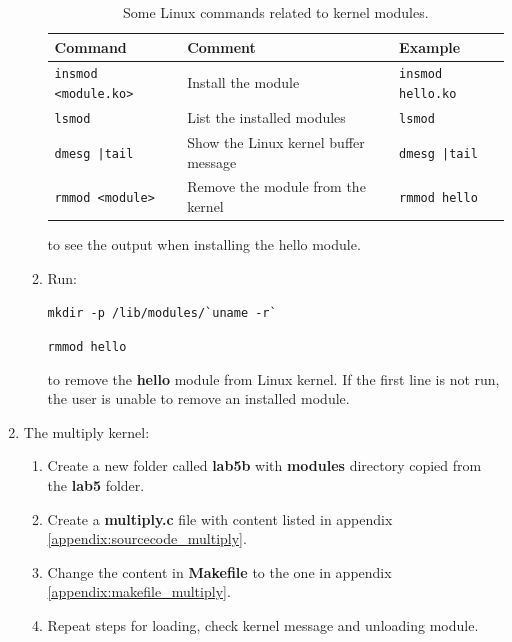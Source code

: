 \documentclass[11pt,letterpaper,titlepage]{article}
\begin{document}
\begin{enumerate}
\begin{enumerate}
        \begin{table}[ht]
        \centering
        \begin{tabular}{@{}lll@{}}
        \toprule
        Command & Comment                              & Example \\ \midrule
        \verb|insmod <module.ko>|        & Install the module                   & \verb|insmod hello.ko|        \\ \midrule
        \verb|lsmod|        & List the installed modules           & \verb|lsmod|        \\ \midrule
        \texttt{dmesg |tail}        & Show the Linux kernel buffer message &    \texttt{dmesg |tail}    \\ \midrule
        \verb|rmmod <module>|        & Remove the module from the kernel    &   \verb|rmmod hello|      \\ \bottomrule
        \end{tabular}
        \caption{Some Linux commands related to kernel modules.}
        \end{table}
        
        to see the output when installing the hello module.
        
        \item Run:
        
        \verb|mkdir -p /lib/modules/`uname -r`|
        
        \verb|rmmod hello|
        
        to remove the \textbf{hello} module from Linux kernel. If the first line is not run, the user is unable to remove an installed module.
        
    \end{enumerate}
    
    \item The multiply kernel:
    
    \begin{enumerate}
        
        \item Create a new folder called \textbf{lab5b} with \textbf{modules} directory copied from the \textbf{lab5} folder.
        
        \item Create a \textbf{multiply.c} file with content listed in appendix \ref{appendix:sourcecode_multiply}.
        
        \item Change the content in \textbf{Makefile} to the one in appendix \ref{appendix:makefile_multiply}.
        
        \item Repeat steps for loading, check kernel message and unloading module.
        
    \end{enumerate}
    
\end{enumerate}
\end{document}
